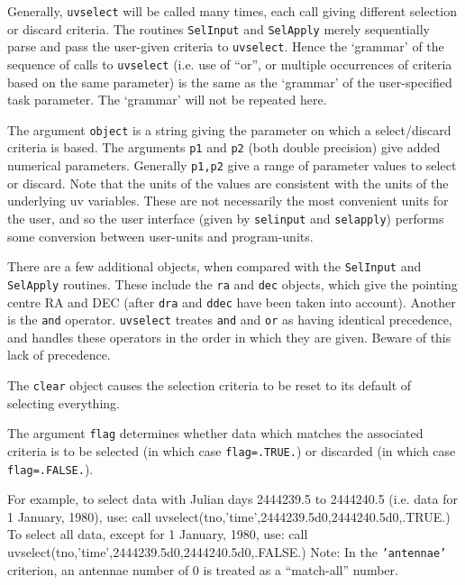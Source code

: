 Generally, {\tt uvselect} will be called many times, each call giving
different selection or discard criteria.  The routines {\tt SelInput}
and {\tt SelApply} merely sequentially parse and pass the user-given
criteria to {\tt uvselect}. Hence the `grammar' of the sequence of calls to
{\tt uvselect} (i.e. use of ``or'', or multiple occurrences of
criteria based on the same parameter) is the same as the `grammar' of the
user-specified task parameter. The `grammar' will not be repeated here.

The argument {\tt object} is a string giving the parameter on which a
select/discard criteria is based. The
arguments {\tt p1} and {\tt p2} (both double precision) give
added numerical parameters. Generally {\tt p1,p2} give a range of
parameter values to select or discard. Note that the units of the values are
consistent with the units
of the underlying uv variables. These are not
necessarily the most convenient units for the user, and so the user
interface (given by {\tt selinput} and {\tt selapply}) performs some
conversion between user-units and program-units.

There are a few additional objects, when compared with the {\tt SelInput}
and {\tt SelApply}
routines. These include the {\tt ra} and {\tt dec} objects, which give the
pointing centre RA and DEC (after {\tt dra} and {\tt ddec} have been taken
into account). Another is the {\tt and} operator. {\tt uvselect} treates
{\tt and} and {\tt or} as having identical precedence, and handles these
operators in the order in which they are given. Beware of this lack of
precedence.

The {\tt clear} object causes the selection criteria to be reset to its
default of selecting everything.

The argument {\tt flag} determines whether data which matches the
associated criteria is to be selected (in which case {\tt flag=.TRUE.})
or discarded (in which case {\tt flag=.FALSE.}).

For example, to select data with Julian days 2444239.5 to 2444240.5 (i.e.
data for 1 January, 1980), use:
{\ninepoint\begintt
     call uvselect(tno,'time',2444239.5d0,2444240.5d0,.TRUE.)
\endtt}
To select all data, except for 1 January, 1980, use:
{\ninepoint\begintt
     call uvselect(tno,'time',2444239.5d0,2444240.5d0,.FALSE.)
\endtt}
Note: In the {\tt 'antennae'} criterion, an antennae number of 0 is treated
as a ``match-all'' number.


